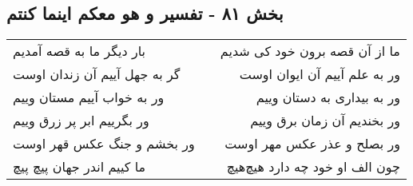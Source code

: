 \begin{center}
\section*{بخش ۸۱ - تفسیر و هو معکم اینما کنتم}
\label{sec:sh081}
\begin{longtable}{l p{0.5cm} r}
بار دیگر ما به قصه آمدیم
&&
ما از آن قصه برون خود کی شدیم
\\
گر به جهل آییم آن زندان اوست
&&
ور به علم آییم آن ایوان اوست
\\
ور به خواب آییم مستان وییم
&&
ور به بیداری به دستان وییم
\\
ور بگرییم ابر پر زرق وییم
&&
ور بخندیم آن زمان برق وییم
\\
ور بخشم و جنگ عکس قهر اوست
&&
ور بصلح و عذر عکس مهر اوست
\\
ما کییم اندر جهان پیچ پیچ
&&
چون الف او خود چه دارد هیچ‌هیچ
\\
\end{longtable}
\end{center}
